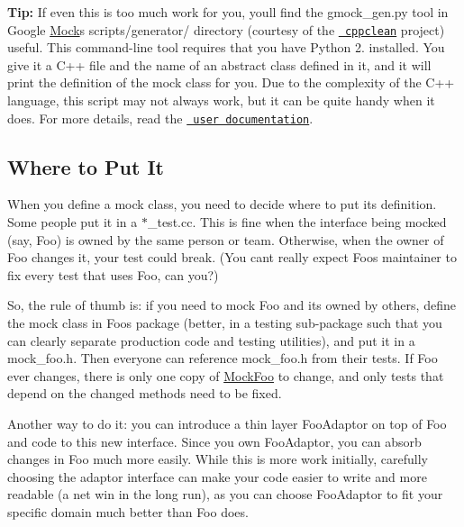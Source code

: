{\bfseries{Tip\+:}} If even this is too much work for you, you\textquotesingle{}ll find the {\ttfamily gmock\+\_\+gen.\+py} tool in Google \mbox{\hyperlink{class_mock}{Mock}}\textquotesingle{}s {\ttfamily scripts/generator/} directory (courtesy of the \href{http://code.google.com/p/cppclean/}{\texttt{ cppclean}} project) useful. This command-\/line tool requires that you have Python 2. installed. You give it a C++ file and the name of an abstract class defined in it, and it will print the definition of the mock class for you. Due to the complexity of the C++ language, this script may not always work, but it can be quite handy when it does. For more details, read the \href{../scripts/generator/README}{\texttt{ user documentation}}.

\subsection*{Where to Put It}

When you define a mock class, you need to decide where to put its definition. Some people put it in a {\ttfamily $\ast$\+\_\+test.cc}. This is fine when the interface being mocked (say, {\ttfamily Foo}) is owned by the same person or team. Otherwise, when the owner of {\ttfamily Foo} changes it, your test could break. (You can\textquotesingle{}t really expect {\ttfamily Foo}\textquotesingle{}s maintainer to fix every test that uses {\ttfamily Foo}, can you?)

So, the rule of thumb is\+: if you need to mock {\ttfamily Foo} and it\textquotesingle{}s owned by others, define the mock class in {\ttfamily Foo}\textquotesingle{}s package (better, in a {\ttfamily testing} sub-\/package such that you can clearly separate production code and testing utilities), and put it in a {\ttfamily mock\+\_\+foo.\+h}. Then everyone can reference {\ttfamily mock\+\_\+foo.\+h} from their tests. If {\ttfamily Foo} ever changes, there is only one copy of {\ttfamily \mbox{\hyperlink{class_mock_foo}{Mock\+Foo}}} to change, and only tests that depend on the changed methods need to be fixed.

Another way to do it\+: you can introduce a thin layer {\ttfamily Foo\+Adaptor} on top of {\ttfamily Foo} and code to this new interface. Since you own {\ttfamily Foo\+Adaptor}, you can absorb changes in {\ttfamily Foo} much more easily. While this is more work initially, carefully choosing the adaptor interface can make your code easier to write and more readable (a net win in the long run), as you can choose {\ttfamily Foo\+Adaptor} to fit your specific domain much better than {\ttfamily Foo} does.

